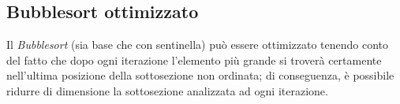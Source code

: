   \clearpage

  \subsection{Bubblesort ottimizzato}\label{subsec:bubble:opt}

  Il \textit{Bubblesort} (sia base che con sentinella) può essere ottimizzato tenendo conto del fatto che
  dopo ogni iterazione l'elemento più grande si troverà certamente nell'ultima posizione della sottosezione
  non ordinata; di conseguenza, è possibile ridurre di dimensione la sottosezione analizzata ad ogni iterazione.

  \inputminted{cpp}{./src/bubble/optimized.cpp}


